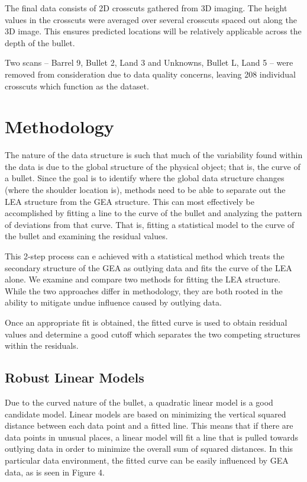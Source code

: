 \documentclass[]{article}
\begin{document}
The final data consists of 2D crosscuts gathered from 3D imaging. The
height values in the crosscuts were averaged over several crosscuts
spaced out along the 3D image. This ensures predicted locations will be
relatively applicable across the depth of the bullet.

Two scans -- Barrel 9, Bullet 2, Land 3 and Unknowns, Bullet L, Land 5
-- were removed from consideration due to data quality concerns, leaving
208 individual crosscuts which function as the dataset.

\section{Methodology}

The nature of the data structure is such that much of the variability
found within the data is due to the global structure of the physical
object; that is, the curve of a bullet. Since the goal is to identify
where the global data structure changes (where the shoulder location
is), methods need to be able to separate out the LEA structure from the
GEA structure. This can most effectively be accomplished by fitting a
line to the curve of the bullet and analyzing the pattern of deviations
from that curve. That is, fitting a statistical model to the curve of
the bullet and examining the residual values.

This 2-step process can e achieved with a statistical method which
treats the secondary structure of the GEA as outlying data and fits the
curve of the LEA alone. We examine and compare two methods for fitting
the LEA structure. While the two approaches differ in methodology, they
are both rooted in the ability to mitigate undue influence caused by
outlying data.

Once an appropriate fit is obtained, the fitted curve is used to obtain
residual values and determine a good cutoff which separates the two
competing structures within the residuals.

\subsection{Robust Linear Models}

Due to the curved nature of the bullet, a quadratic linear model is a
good candidate model. Linear models are based on minimizing the vertical
squared distance between each data point and a fitted line. This means
that if there are data points in unusual places, a linear model will fit
a line that is pulled towards outlying data in order to minimize the
overall sum of squared distances. In this particular data environment,
the fitted curve can be easily influenced by GEA data, as is seen in
Figure 4.
\end{document}
